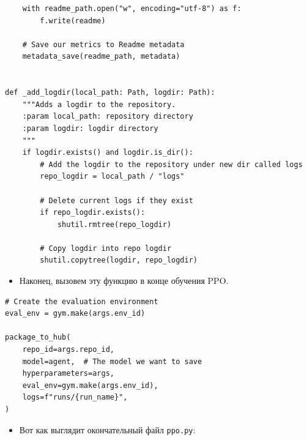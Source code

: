 \documentclass[11pt,a4paper]{article}
\begin{document}
\begin{lstlisting}
    with readme_path.open("w", encoding="utf-8") as f:
        f.write(readme)

    # Save our metrics to Readme metadata
    metadata_save(readme_path, metadata)


def _add_logdir(local_path: Path, logdir: Path):
    """Adds a logdir to the repository.
    :param local_path: repository directory
    :param logdir: logdir directory
    """
    if logdir.exists() and logdir.is_dir():
        # Add the logdir to the repository under new dir called logs
        repo_logdir = local_path / "logs"

        # Delete current logs if they exist
        if repo_logdir.exists():
            shutil.rmtree(repo_logdir)

        # Copy logdir into repo logdir
        shutil.copytree(logdir, repo_logdir)
\end{lstlisting}

\begin{itemize}
\tightlist
\item
  Наконец, вызовем эту функцию в конце обучения PPO.
\end{itemize}

\begin{lstlisting}
# Create the evaluation environment
eval_env = gym.make(args.env_id)

package_to_hub(
    repo_id=args.repo_id,
    model=agent,  # The model we want to save
    hyperparameters=args,
    eval_env=gym.make(args.env_id),
    logs=f"runs/{run_name}",
)
\end{lstlisting}

\begin{itemize}
\tightlist
\item
  Вот как выглядит окончательный файл \texttt{ppo.py}:
\end{itemize}
\end{document}
